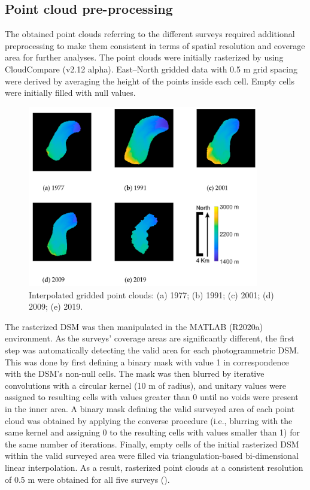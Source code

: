 \subsection{Point cloud pre-processing}\label{sec:2:pcd_preproc}

The obtained point clouds referring to the different surveys required additional preprocessing to make them consistent in terms of spatial resolution and coverage area for further analyses.
The point clouds were initially rasterized by using CloudCompare (v2.12 alpha).
East–North gridded data with 0.5 m grid spacing were derived by averaging the height of the points inside each cell. 
Empty cells were initially filled with null values.

\begin{figure}[ht]
    \centering
    \includegraphics[width=0.90\textwidth]{pcd_rasterized.png}
    \caption{Interpolated gridded point clouds: (a) 1977; (b) 1991; (c) 2001; (d) 2009; (e) 2019.}
    \label{fig:2:pcd_rasterzed}
\end{figure}

The rasterized DSM was then manipulated in the MATLAB (R2020a) environment.
As the surveys' coverage areas are significantly different, the first step was automatically detecting the valid area for each photogrammetric DSM. 
This was done by first defining a binary mask with value 1 in correspondence with the DSM's non-null cells. 
The mask was then blurred by iterative convolutions with a circular kernel (10 m of radius), and unitary values were assigned to resulting cells with values greater than 0 until no voids were present in the inner area.
A binary mask defining the valid surveyed area of each point cloud was obtained by applying the converse procedure (i.e., blurring with the same kernel and assigning 0 to the resulting cells with values smaller than 1) for the same number of iterations.
Finally, empty cells of the initial rasterized DSM within the valid surveyed area were filled via triangulation-based bi-dimensional linear interpolation.
As a result, rasterized point clouds at a consistent resolution of 0.5 m were obtained for all five surveys ().

